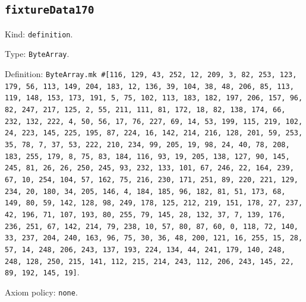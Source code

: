 \documentclass[11pt]{article}
\begin{document}
\subsection*{\texttt{fixtureData170}}
\noindent Kind: \texttt{definition}.\par
\noindent Type: \texttt{ByteArray}.\par
\noindent Definition: \texttt{ByteArray.mk \#[116, 129, 43, 252, 12, 209, 3, 82, 253, 123, 179, 56, 113, 149, 204, 183, 12, 136, 39, 104, 38, 48, 206, 85, 113, 119, 148, 153, 173, 191, 5, 75, 102, 113, 183, 182, 197, 206, 157, 96, 82, 247, 217, 125, 2, 55, 211, 111, 81, 172, 18, 82, 138, 174, 66, 232, 132, 222, 4, 50, 56, 17, 76, 227, 69, 14, 53, 199, 115, 219, 102, 24, 223, 145, 225, 195, 87, 224, 16, 142, 214, 216, 128, 201, 59, 253, 35, 78, 7, 37, 53, 222, 210, 234, 99, 205, 19, 98, 24, 40, 78, 208, 183, 255, 179, 8, 75, 83, 184, 116, 93, 19, 205, 138, 127, 90, 145, 245, 81, 26, 26, 250, 245, 93, 232, 133, 101, 67, 246, 22, 164, 239, 67, 10, 254, 104, 57, 162, 75, 216, 230, 171, 251, 89, 220, 221, 129, 234, 20, 180, 34, 205, 146, 4, 184, 185, 96, 182, 81, 51, 173, 68, 149, 80, 59, 142, 128, 98, 249, 178, 125, 212, 219, 151, 178, 27, 237, 42, 196, 71, 107, 193, 80, 255, 79, 145, 28, 132, 37, 7, 139, 176, 236, 251, 67, 142, 214, 79, 238, 10, 57, 80, 87, 60, 0, 118, 72, 140, 33, 237, 204, 240, 163, 96, 75, 30, 36, 48, 200, 121, 16, 255, 15, 28, 57, 14, 248, 206, 243, 137, 193, 224, 134, 44, 241, 179, 140, 248, 248, 128, 250, 215, 141, 112, 215, 214, 243, 112, 206, 243, 145, 22, 89, 192, 145, 19]}.\par
\noindent Axiom policy: \texttt{none}.\par
\end{document}
